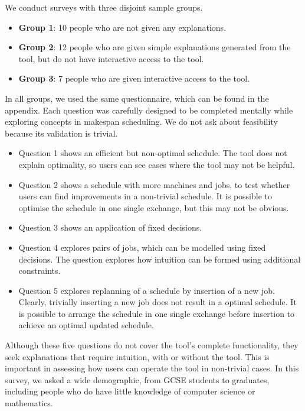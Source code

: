 We conduct surveys with three disjoint sample groups.

\begin{itemize}
	\item \textbf{Group 1}: 10 people who are not given any explanations.
	\item \textbf{Group 2}: 12 people who are given simple explanations generated from the tool, but do not have interactive access to the tool.
	\item \textbf{Group 3}: 7 people who are given interactive access to the tool.
\end{itemize}

In all groups, we used the same questionnaire, which can be found in the appendix. Each question was carefully designed to be completed mentally while exploring concepts in makespan scheduling. We do not ask about feasibility because its validation is trivial. 

\begin{itemize}
	\item Question 1 shows an efficient but non-optimal schedule. The tool does not explain optimality, so users can see cases where the tool may not be helpful.
	\item Question 2 shows a schedule with more machines and jobs, to test whether users can find improvements in a non-trivial schedule. It is possible to optimise the schedule in one single exchange, but this may not be obvious.
	\item Question 3 shows an application of fixed decisions.
	\item Question 4 explores pairs of jobs, which can be modelled using fixed decisions. The question explores how intuition can be formed using additional constraints.
	\item Question 5 explores replanning of a schedule by insertion of a new job. Clearly, trivially inserting a new job does not result in a optimal schedule. It is possible to arrange the schedule in one single exchange before insertion to achieve an optimal updated schedule.
\end{itemize}

Although these five questions do not cover the tool's complete functionality, they seek explanations that require intuition, with or without the tool. This is important in assessing how users can operate the tool in non-trivial cases. In this survey, we asked a wide demographic, from GCSE students to graduates, including people who do have little knowledge of computer science or mathematics.

